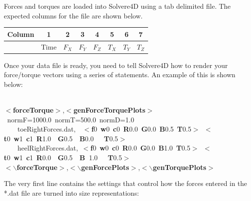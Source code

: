 \documentclass[singlecolumn,12pt]{article}
\newcommand{\hlstd}[1]{\textcolor[rgb]{0,0,0}{#1}}
\newcommand{\hlkey}[1]{\textcolor[rgb]{0,0,1}{\bf{#1}}}
\newcommand{\hlnum}[1]{\textcolor[rgb]{0.66,0,0.66}{#1}}
\begin{document}
Forces and torques are loaded into Solvere4D using a tab delimited
file. The expected columns for the file are shown below.

\vspace{1cm}
\begin{center}
\begin{tabular}{c|c|c|c|c|c|c|c|}
\hline Column & 1 & 2 & 3 & 4 & 5 & 6 & 7 \\
\hline & Time & $F_X$ & $F_Y$ & $F_Z$ & $T_X$ & $T_Y$ & $T_Z$\\
\end{tabular}
\end{center}
\vspace{1cm}

Once your data file is ready, you need to tell Solvere4D how to
render your force/torque vectors using a series of statements. An
example of this is shown below:

\vspace{1cm}
\hlstd{\\
}\hlkey{$<$forceTorque$>$}\hlstd{,}\hlkey{$<$genForceTorquePlots$>$}\hlstd{\ normF=}\hlnum{1000.0\ }\hlstd{normT=}\hlnum{500.0\ }\hlstd{normD=}\hlnum{1.0\\
\hlstd{\ \ \ \ }}\hlstd{toeRightForces.dat,\hlstd{\ \ }}\hlkey{$<$f}\hlnum{0\ }\hlkey{w}\hlnum{0\ }\hlkey{c}\hlnum{0\ }\hlkey{R}\hlnum{0.0\ }\hlkey{G}\hlnum{0.0\ }\hlkey{B}\hlnum{0.5\ }\hlkey{T}\hlnum{0.5}\hlkey{$>$}\hlstd{\ }\hlkey{$<$t}\hlnum{0\ }\hlkey{w}\hlnum{1\ }\hlkey{c}\hlnum{1\ }\hlkey{R}\hlnum{1.0\ \ }\hlkey{G}\hlnum{0.5\ \ }\hlkey{B}\hlnum{0.0\ \ \ }\hlkey{T}\hlnum{0.5}\hlkey{$>$}\hlstd{\\
\hlstd{\ \ \ \ }heelRightForces.dat,\ }\hlkey{$<$f}\hlnum{0\ }\hlkey{w}\hlnum{0\ }\hlkey{c}\hlnum{0\ }\hlkey{R}\hlnum{0.0\ }\hlkey{G}\hlnum{0.0\ }\hlkey{B}\hlnum{1.0\ }\hlkey{T}\hlnum{0.5}\hlkey{$>$}\hlstd{\ }\hlkey{$<$t}\hlnum{0\ }\hlkey{w}\hlnum{1\ }\hlkey{c}\hlnum{1\ }\hlkey{R}\hlnum{0.0\ \ }\hlkey{G}\hlnum{0.5\ \ }\hlkey{B\ }\hlnum{1.0\ \ \ }\hlkey{T}\hlnum{0.5}\hlkey{$>$}\hlstd{\\
}\hlkey{$<$$\backslash$forceTorque$>$}\hlstd{,}\hlkey{$<$$\backslash$genForcePlots$>$}\hlstd{,}\hlkey{$<$$\backslash$genTorquePlots$>$}
\vspace{1cm}

The very first line contains the settings that control how the
forces entered in the *.dat file are turned into size
representations:
\end{document}
